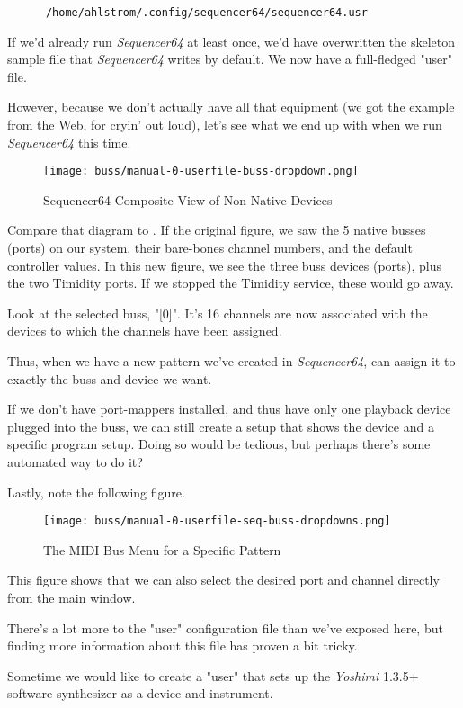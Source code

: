    \begin{verbatim}
      /home/ahlstrom/.config/sequencer64/sequencer64.usr
   \end{verbatim}

   If we'd already run \textsl{Sequencer64} at least once, we'd have
   overwritten the skeleton sample file that \textsl{Sequencer64}
   writes by default.  We now have a full-fledged "user" file.

   However, because we don't actually have all that equipment (we got the
   example from the Web, for cryin' out loud), let's see what we end up with
   when we run \textsl{Sequencer64} this time.

\begin{figure}[H]
   \centering 
   \texttt{[image: buss/manual-0-userfile-buss-dropdown.png]}
   \caption{Sequencer64 Composite View of Non-Native Devices}
   \label{fig:seq64_manual_0_userfile_buss_dropdown}
\end{figure}

   Compare that diagram to .
   If the original figure, we saw the 5 native busses (ports) on our system,
   their bare-bones channel numbers, and the default controller values.  In
   this new figure, we see the three buss devices (ports), plus the two
   Timidity ports.  If we stopped the Timidity service, these would go away.

   Look at the selected buss, "[0]".  It's 16 channels are now associated with
   the devices to which the channels have been assigned.

   Thus, when we have a new pattern we've created in \textsl{Sequencer64},
   can assign it to exactly the buss and device we want.

   If we don't have port-mappers installed, and thus have only one playback
   device plugged into the buss, we can still create a setup that
   shows the device and a specific program setup.  Doing so would be tedious,
   but perhaps there's some automated way to do it?

   Lastly, note the following figure.

\begin{figure}[H]
   \centering 
   \texttt{[image: buss/manual-0-userfile-seq-buss-dropdowns.png]}
   \caption{The MIDI Bus Menu for a Specific Pattern}
   \label{fig:seq64_manual_0_userfile_seq_buss_dropdown}
\end{figure}

   This figure shows that we can also select the desired port and channel
   directly from the main window.

   There's a lot more to the "user" configuration file than we've exposed here,
   but finding more information about this file has proven a bit tricky.

   Sometime we would like to create a "user" that sets up the
   \textsl{Yoshimi} 1.3.5+ software synthesizer as a device and instrument.

